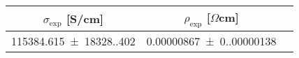 \begin{tabular}{ccc}
\toprule
$\sigma_{\exp}$ [S/cm] & $\rho_{\exp}$ [$\Omega$cm] \\
\midrule
\num{115384.615(18328.402)} & \num{0.00000867(0.00000138)} \\
\bottomrule
\end{tabular}
